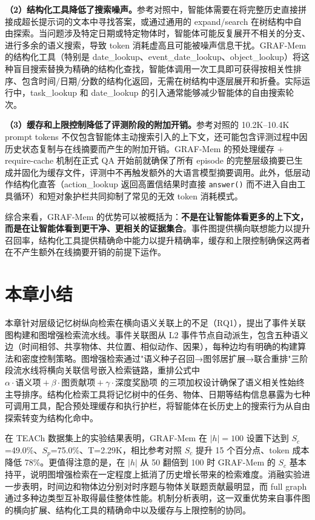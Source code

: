 \textbf{（2）结构化工具降低了搜索噪声。}参考对照中，智能体需要在将完整历史直接拼接成超长提示词的文本中寻找答案，或通过通用的 expand/search 在树结构中自由探索。当问题涉及特定日期或特定物体时，智能体可能反复展开不相关的分支、进行多余的语义搜索，导致 token 消耗虚高且可能被噪声信息干扰。GRAF-Mem 的结构化工具（特别是 date\_lookup、event\_date\_lookup、object\_lookup）将这种盲目搜索替换为精确的结构化查找，智能体调用一次工具即可获得按相关性排序、包含时间/日期/分数的结构化返回，无需在树结构中逐层展开和折叠。实际运行中，task\_lookup 和 date\_lookup 的引入通常能够减少智能体的自由搜索轮次。

\textbf{（3）缓存和上限控制降低了评测阶段的附加开销。}参考对照的 10.2K–10.4K prompt tokens 不仅包含智能体主动搜索引入的上下文，还可能包含评测过程中因历史状态复制与在线摘要而产生的附加开销。GRAF-Mem 的预处理缓存 + require-cache 机制在正式 QA 开始前就确保了所有 episode 的完整层级摘要已生成并固化为缓存文件，评测中不再触发额外的大语言模型摘要调用。此外，低层动作结构化直答（action\_lookup 返回高置信结果时直接 \texttt{answer()} 而不进入自由工具循环）和短对象护栏共同抑制了常见的无效 token 消耗模式。

综合来看，GRAF-Mem 的优势可以被概括为：\textbf{不是在让智能体看更多的上下文，而是在让智能体看到更干净、更相关的证据集合}。事件图提供横向联想能力以提升召回率，结构化工具提供精确命中能力以提升精确率，缓存和上限控制确保这两者在不产生额外在线摘要开销的前提下运作。

\section{本章小结}

本章针对层级记忆树纵向检索在横向语义关联上的不足（RQ1），提出了事件关联图构建和图增强检索流水线。事件关联图从 L2 事件节点自动派生，包含五种语义边（时间相邻、共享物体、共位置、相似动作、因果），每种边均有明确的构建算法和密度控制策略。图增强检索通过"语义种子召回→图邻居扩展→联合重排"三阶段流水线将横向关联信号嵌入检索链路，重排公式中 $\alpha \cdot \text{语义项} + \beta \cdot \text{图贡献项} + \gamma \cdot \text{深度奖励项}$ 的三项加权设计确保了语义相关性始终主导排序。结构化检索工具将记忆树中的任务、物体、日期等结构信息暴露为七种可调用工具，配合预处理缓存和执行护栏，将智能体在长历史上的搜索行为从自由探索转变为结构化命中。

在 TEACh 数据集上的实验结果表明，GRAF-Mem 在 $|h|=100$ 设置下达到 $S_c$=49.0\%、$S_p$=75.0\%、T=2.29K，相比参考对照 $S_c$ 提升 15 个百分点、token 成本降低 78\%。更值得注意的是，在 $|h|$ 从 50 翻倍到 100 时 GRAF-Mem 的 $S_c$ 基本持平，说明图增强检索在一定程度上抵消了历史增长带来的检索难度。消融实验进一步表明，时间边和物体边分别对时序题与物体关联题贡献最明显，而 full graph 通过多种边类型互补取得最佳整体性能。机制分析表明，这一双重优势来自事件图的横向扩展、结构化工具的精确命中以及缓存与上限控制的协同。
